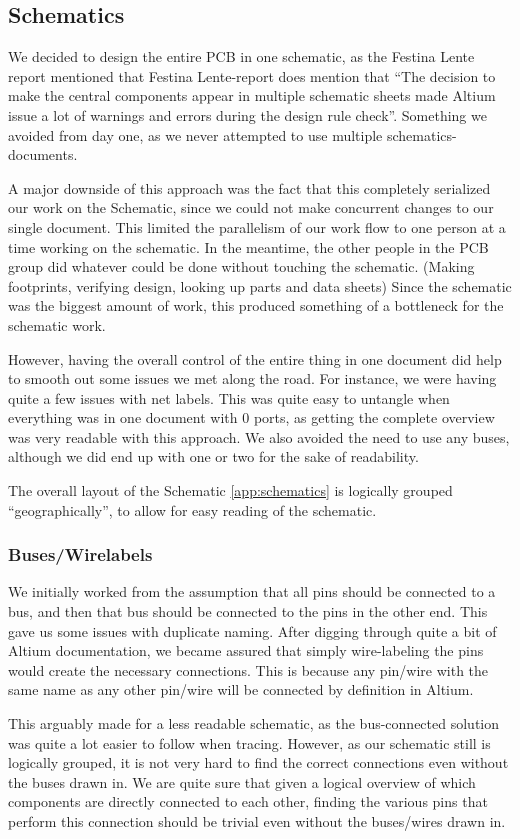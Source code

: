 \subsection {Schematics}

We decided to design the entire \ac{PCB} in one schematic, as the Festina Lente
report mentioned that Festina Lente-report does mention that 
``The decision to make the central components appear in multiple schematic
sheets made Altium issue a lot of warnings and errors during the design rule 
check''\cite[p.~49]{berg2011festinalente}. Something we avoided from day one, 
as we never attempted to use multiple schematics-documents.

A major downside of this approach was the fact that this completely serialized
our work on the Schematic, since we could not make concurrent changes to our
single document. This limited the parallelism of our work flow to one person at a
time working on the schematic.  In the meantime, the other people in the
\ac{PCB} group did whatever could be done without touching the
schematic. (Making footprints, verifying design, looking up parts and data
sheets) Since the schematic was the biggest amount of work, this produced
something of a bottleneck for the schematic work.

However, having the overall control of the entire thing in one document
did help to smooth out some issues we met along the road. For instance,
we were having quite a few issues with net labels. This was quite easy to
untangle when everything was in one document with 0 ports, as getting the
complete overview was very readable with this approach. We also avoided the need
to use any buses, although we did end up with one or two for the sake
of readability.

The overall layout of the Schematic \ref{app:schematics} is logically grouped ``geographically'', to
allow for easy reading of the schematic.

\subsubsection {Buses/Wirelabels}
We initially worked from the assumption that all pins should be connected to a
bus, and then that bus should be connected to the pins in the other end. This
gave us some issues with duplicate naming. After digging through quite a bit of
Altium documentation, we became assured that simply wire-labeling the pins
would create the necessary connections. This is because any pin/wire with the
same name as any other pin/wire will be connected by definition in Altium.

This arguably made for a less readable schematic, as the bus-connected solution
was quite a lot easier to follow when tracing. However, as our schematic still
is logically grouped, it is not very hard to find the correct connections even
without the buses drawn in. We are quite sure that given a logical overview of
which components are directly connected to each other, finding the various pins
that perform this connection should be trivial even without the buses/wires
drawn in.


